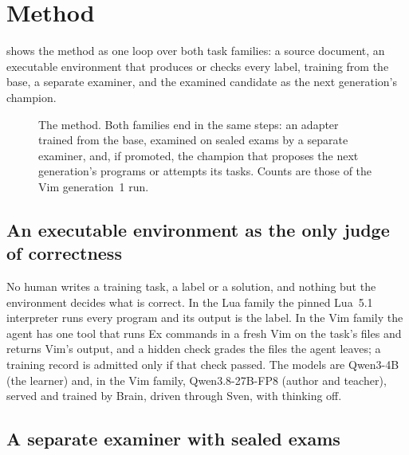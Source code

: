 \section{Method}\label{sec:method}

 shows the method as one loop over both task families: a source document, an executable environment that
produces or checks every label, training from the base, a separate examiner, and the examined candidate as the next
generation's champion.

\begin{figure}[htbp]
\centering

\caption{The method. Both families end in the same steps: an adapter trained from the base, examined on sealed exams by a
separate examiner, and, if promoted, the champion that proposes the next generation's programs or attempts its tasks. Counts
are those of the Vim generation~1 run.}\label{fig:method}
\end{figure}

\subsection{An executable environment as the only judge of correctness}\label{sec:m-teacher}

No human writes a training task, a label or a solution, and nothing but the environment decides what is correct. In the Lua family the pinned Lua~5.1 interpreter runs every program
and its output is the label. In the Vim family the agent has one tool that runs Ex commands in a fresh Vim on the task's files
and returns Vim's output, and a hidden check grades the files the agent leaves; a training record is admitted only if that
check passed. The models are Qwen3-4B (the learner) and, in the Vim family, Qwen3.8-27B-FP8 (author and teacher), served and
trained by Brain, driven through Sven, with thinking off.

\subsection{A separate examiner with sealed exams}\label{sec:m-examiner}

